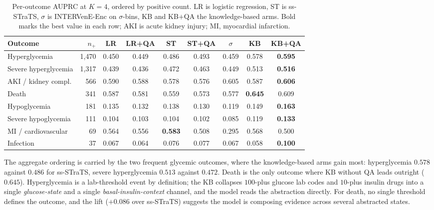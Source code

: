 \begin{table}[htbp]
\centering
\small
\caption{Per-outcome AUPRC at $K = 4$, ordered by positive count. LR is
logistic regression, ST is ss-STraTS, $\sigma$ is INTERVenE-Enc on
$\sigma$-bins, KB and KB$+$QA the knowledge-based arms. Bold marks the
best value in each row; AKI is acute kidney injury; MI, myocardial
infarction.}
\label{tab:per-outcome}
\begin{tabular}{lrccccccc}
\toprule
Outcome & $n_+$ & LR & LR+QA & ST & ST+QA & $\sigma$ & KB & KB+QA \\
\midrule
Hyperglycemia         & 1{,}470 & 0.450 & 0.449 & 0.486 & 0.493 & 0.459 & 0.578 & \textbf{0.595} \\
Severe hyperglycemia  & 1{,}317 & 0.439 & 0.436 & 0.472 & 0.463 & 0.449 & 0.513 & \textbf{0.516} \\
AKI / kidney compl.   &   566   & 0.590 & 0.588 & 0.578 & 0.576 & 0.605 & 0.587 & \textbf{0.606} \\
Death                 &   341   & 0.587 & 0.581 & 0.559 & 0.573 & 0.577 & \textbf{0.645} & 0.609 \\
Hypoglycemia          &   181   & 0.135 & 0.132 & 0.138 & 0.130 & 0.119 & 0.149 & \textbf{0.163} \\
Severe hypoglycemia   &   111   & 0.104 & 0.103 & 0.104 & 0.102 & 0.085 & 0.119 & \textbf{0.133} \\
MI / cardiovascular   &    69   & 0.564 & 0.556 & \textbf{0.583} & 0.508 & 0.295 & 0.568 & 0.500 \\
Infection             &    37   & 0.067 & 0.064 & 0.076 & 0.077 & 0.067 & 0.058 & \textbf{0.100} \\
\bottomrule
\end{tabular}
\end{table}

The aggregate ordering is carried by the two frequent glycemic outcomes,
where the knowledge-based arms gain most: hyperglycemia $0.578$ against
$0.486$ for ss-STraTS, severe hyperglycemia $0.513$ against $0.472$.
Death is the only outcome where KB without QA leads outright ($0.645$).
Hyperglycemia is a lab-threshold event by definition; the KB collapses
$100$-plus glucose lab codes and $10$-plus insulin drugs into a single
\emph{glucose-state} and a single \emph{basal-insulin-context} channel,
and the model reads the abstraction directly. For death, no single
threshold defines the outcome, and the lift ($+0.086$ over ss-STraTS)
suggests the model is composing evidence across several
abstracted states.

